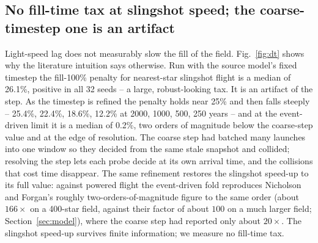 \subsection{No fill-time tax at slingshot speed; the coarse-timestep one is an artifact}
Light-speed lag does not measurably slow the fill of the field. Fig.~\ref{fig:dt} shows why the
literature intuition says otherwise. Run with the source model's fixed timestep the fill-100\%
penalty for nearest-star slingshot flight is a median of 26.1\%, positive in all 32 seeds -- a
large, robust-looking tax. It is an artifact of the step. As the timestep is refined the penalty
holds near 25\% and then falls steeply -- 25.4\%, 22.4\%, 18.6\%, 12.2\% at 2000, 1000, 500, 250
years -- and at the event-driven limit it is a median of 0.2\%, two orders of magnitude below the
coarse-step value and at the edge of resolution. The coarse step
had batched many launches into one window so they decided from the same stale snapshot and
collided; resolving the step lets each probe decide at its own arrival time, and the collisions
that cost time disappear. The same refinement restores the slingshot speed-up to its full value:
against powered flight the event-driven fold reproduces Nicholson and Forgan's roughly
two-orders-of-magnitude figure to the same order (about $166\times$ on a 400-star field, against
their factor of about $100$ on a much larger field; Section~\ref{sec:model}), where the coarse step
had reported only about $20\times$. The slingshot speed-up survives finite information; we measure no fill-time tax.

